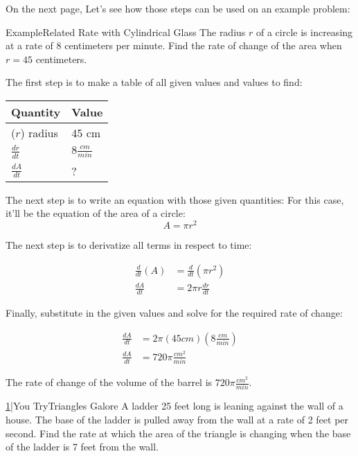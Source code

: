 \documentclass{MathNotes}
\newenvironment{example}[1]
{\begin{BlueBox}{Example}{#1}}{\end{BlueBox}}
\newenvironment{practice}[2]
{\begin{PurpleBox}{\texorpdfstring{#1}\Big|You Try}{#2}}{\end{PurpleBox}}
\begin{document}
On the next page, Let's see how those steps can be used on an example problem:
\begin{example}{Related Rate with Cylindrical Glass}
    The radius $r$ of a circle is increasing at a rate of 8 centimeters per
    minute. Find the rate of change of the area when $r = 45$ centimeters.

    The first step is to make a table of all given values and values to find:
    \begin{center}
        \begin{tabular}{l|l}
            Quantity & Value\\
            \hline
            ($r$) radius & 45 cm\\
            $\frac{dr}{dt}$ & $8\frac{cm}{min}$\\
            $\frac{dA}{dt}$ & ?\\
        \end{tabular}
    \end{center}

    The next step is to write an equation with those given quantities: For this
    case, it'll be the equation of the area of a circle: $$A=\pi r^2$$
   
    The next step is to derivatize all terms in respect to time:

    \begin{align*}
        \frac{d}{dt}(A)&=\frac{d}{dt}(\pi r^2)\\
        \frac{dA}{dt}&=2\pi r\frac{dr}{dt}
    \end{align*}

    Finally, substitute in the given values and solve for the required rate
    of change:

    \begin{align*}
        \frac{dA}{dt}&=2\pi (45cm)(8\frac{cm}{min})\\
        \frac{dA}{dt}&=720\pi\frac{cm^2}{min}
    \end{align*}

    The rate of change of the volume of the barrel is $720\pi\frac{cm^2}{min}$.
\end{example}

\begin{practice}{\hyperref[ans:2.5-1]{1}}{Triangles Galore}
    \label{prac:2.5-1}
    A ladder 25 feet long is leaning against the wall of a house. The base
    of the ladder is pulled away from the wall at a rate of 2 feet per
    second. Find the rate at which the area of the triangle is changing
    when the base of the ladder is 7 feet from the wall.
\end{practice}
\end{document}
